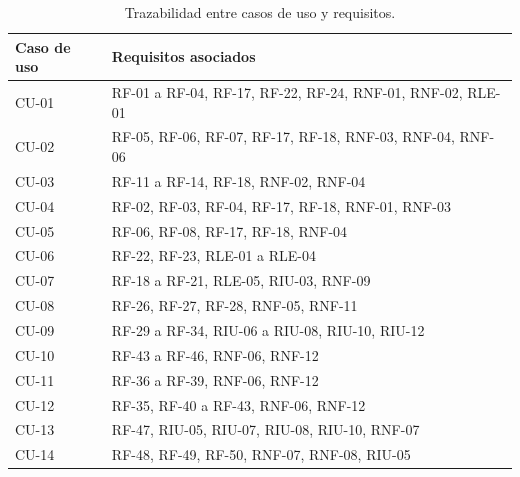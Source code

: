 \begin{table}[H]
\centering
\scriptsize
\begin{tabularx}{\textwidth}{p{2.5cm}X}
\toprule
\textbf{Caso de uso} & \textbf{Requisitos asociados} \\
\midrule
CU-01 & RF-01 a RF-04, RF-17, RF-22, RF-24, RNF-01, RNF-02, RLE-01 \\
CU-02 & RF-05, RF-06, RF-07, RF-17, RF-18, RNF-03, RNF-04, RNF-06 \\
CU-03 & RF-11 a RF-14, RF-18, RNF-02, RNF-04 \\
CU-04 & RF-02, RF-03, RF-04, RF-17, RF-18, RNF-01, RNF-03 \\
CU-05 & RF-06, RF-08, RF-17, RF-18, RNF-04 \\
CU-06 & RF-22, RF-23, RLE-01 a RLE-04 \\
CU-07 & RF-18 a RF-21, RLE-05, RIU-03, RNF-09 \\
CU-08 & RF-26, RF-27, RF-28, RNF-05, RNF-11 \\
CU-09 & RF-29 a RF-34, RIU-06 a RIU-08, RIU-10, RIU-12 \\
CU-10 & RF-43 a RF-46, RNF-06, RNF-12 \\
CU-11 & RF-36 a RF-39, RNF-06, RNF-12 \\
CU-12 & RF-35, RF-40 a RF-43, RNF-06, RNF-12 \\
CU-13 & RF-47, RIU-05, RIU-07, RIU-08, RIU-10, RNF-07 \\
CU-14 & RF-48, RF-49, RF-50, RNF-07, RNF-08, RIU-05 \\
\bottomrule
\end{tabularx}
\caption{Trazabilidad entre casos de uso y requisitos.}
\label{tab:trazabilidad_cu_rf}
\end{table}

